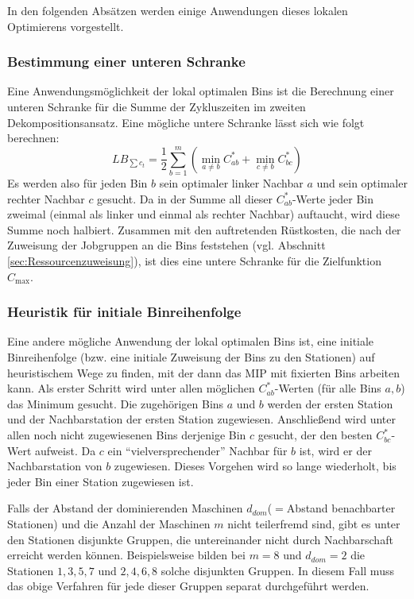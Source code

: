 \documentclass{scrreprt}
\begin{document}
In den folgenden Absätzen werden einige Anwendungen dieses lokalen Optimierens vorgestellt.

\subsubsection{Bestimmung einer unteren Schranke}
\label{subsubsec:BestimmungEinerUnterenSchranke}
Eine Anwendungsmöglichkeit der lokal optimalen Bins ist die Berechnung einer unteren Schranke für die Summe der Zykluszeiten im zweiten Dekompositionsansatz.
Eine mögliche untere Schranke lässt sich wie folgt berechnen:
\[LB_{\sum c_t} = \frac{1}{2} \sum_{b=1}^m \left( \min_{a\neq b} C_{ab}^* + \min_{c\neq b} C_{bc}^* \right) \]
Es werden also für jeden Bin $b$ sein optimaler linker Nachbar $a$ und sein optimaler rechter Nachbar $c$ gesucht.
Da in der Summe all dieser $C_{ab}^*$-Werte jeder Bin zweimal (einmal als linker und einmal als rechter Nachbar) auftaucht,
wird diese Summe noch halbiert.
Zusammen mit den auftretenden Rüstkosten, die nach der Zuweisung der Jobgruppen an die Bins feststehen (vgl. Abschnitt \ref{sec:Ressourcenzuweisung}),
ist dies eine untere Schranke für die Zielfunktion $C_{\max}$.

\subsubsection{Heuristik für initiale Binreihenfolge}
\label{subsubsec:HeuristikFuerInitialeBinreihenfolge}
Eine andere mögliche Anwendung der lokal optimalen Bins ist, eine initiale Binreihenfolge (bzw. eine initiale Zuweisung der Bins zu den Stationen)
auf heuristischem Wege zu finden, mit der dann das MIP mit fixierten Bins arbeiten kann.
Als erster Schritt wird unter allen möglichen $C_{ab}^*$-Werten (für alle Bins $a,b$) das Minimum gesucht.
Die zugehörigen Bins $a$ und $b$ werden der ersten Station und der Nachbarstation der ersten Station zugewiesen.
Anschließend wird unter allen noch nicht zugewiesenen Bins derjenige Bin $c$ gesucht, der den besten $C_{bc}^*$-Wert aufweist.
Da $c$ ein "`vielversprechender"' Nachbar für $b$ ist, wird er der Nachbarstation von $b$ zugewiesen.
Dieses Vorgehen wird so lange wiederholt, bis jeder Bin einer Station zugewiesen ist.

Falls der Abstand der dominierenden Maschinen $d_{\mathit{dom}}$($=$Abstand benachbarter Stationen) und die Anzahl der Maschinen $m$ nicht teilerfremd sind,
gibt es unter den Stationen disjunkte Gruppen, die untereinander nicht durch Nachbarschaft erreicht werden können.
Beispielsweise bilden bei $m=8$ und $d_{\mathit{dom}}=2$ die Stationen $1,3,5,7$ und $2,4,6,8$ solche disjunkten Gruppen.
In diesem Fall muss das obige Verfahren für jede dieser Gruppen separat durchgeführt werden.
\end{document}
